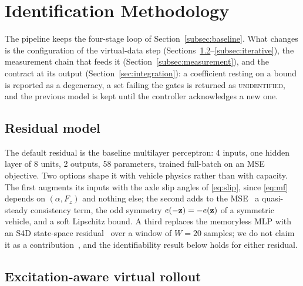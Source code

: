 \section{Identification Methodology}
\label{sec:method}

The pipeline keeps the four-stage loop of Section~\ref{subsec:baseline}. What
changes is the configuration of the virtual-data step
(Sections~\ref{subsec:excitation}--\ref{subsec:iterative}), the measurement
chain that feeds it (Section~\ref{subsec:measurement}), and the contract at its
output (Section~\ref{sec:integration}): a coefficient resting on a bound is
reported as a degeneracy, a set failing the gates is returned as
\textsc{unidentified}, and the previous model is kept until the controller
acknowledges a new one.

\subsection{Residual model}
\label{subsec:residual}

The default residual is the baseline multilayer perceptron: 4 inputs, one
hidden layer of 8 units, 2 outputs, 58 parameters, trained full-batch on an MSE
objective. Two options shape it with vehicle physics rather than with capacity.
The first augments its inputs with the axle slip angles of \eqref{eq:slip},
since \eqref{eq:mf} depends on $(\alpha,F_{z})$ and nothing else; the second
adds to the MSE~\cite{deepdynamics2024} a quasi-steady consistency term, the
odd symmetry $e(-\mathbf{z})=-e(\mathbf{z})$ of a symmetric vehicle, and a soft Lipschitz
bound. A third replaces the memoryless MLP with an S4D state-space
residual~\cite{gu2022s4d} over a window of $W=20$ samples; we do not claim it
as a contribution~\cite{visionsysid2026}, and the identifiability result below
holds for either residual.

\subsection{Excitation-aware virtual rollout}
\label{subsec:excitation}

